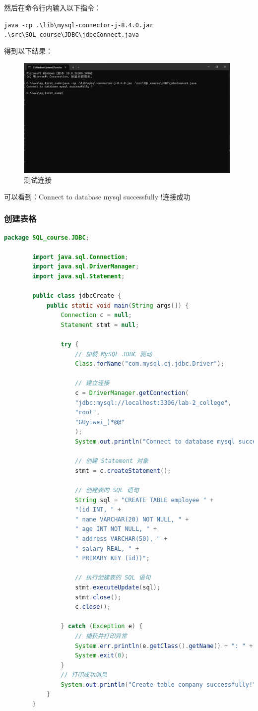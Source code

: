 \documentclass{article}
\begin{document}
	然后在命令行内输入以下指令：
	
	\verb|java -cp .\lib\mysql-connector-j-8.4.0.jar .\src\SQL_course\JDBC\jdbcConnect.java|
	
	得到以下结果：
	
	\begin{figure}[H]
		\centering
		\includegraphics[width=11cm]{./images/6.测试连接.png}
		\caption{测试连接}
	\end{figure}
	
	可以看到：Connect to database mysql successfully !连接成功
	
	\subsubsection{创建表格}
	
	\begin{lstlisting}[language=java, title=jdbcCreate, tabsize=4]
		package SQL_course.JDBC;
		
		import java.sql.Connection;
		import java.sql.DriverManager;
		import java.sql.Statement;
		
		public class jdbcCreate {
			public static void main(String args[]) {
				Connection c = null;
				Statement stmt = null;
				
				try {
					// 加载 MySQL JDBC 驱动
					Class.forName("com.mysql.cj.jdbc.Driver");
					
					// 建立连接
					c = DriverManager.getConnection(
					"jdbc:mysql://localhost:3306/lab-2_college",
					"root",
					"GUyiwei_)*@@"
					);
					System.out.println("Connect to database mysql successfully!");
					
					// 创建 Statement 对象
					stmt = c.createStatement();
					
					// 创建表的 SQL 语句
					String sql = "CREATE TABLE employee " +
					"(id INT, " +
					" name VARCHAR(20) NOT NULL, " +
					" age INT NOT NULL, " +
					" address VARCHAR(50), " +
					" salary REAL, " +
					" PRIMARY KEY (id))";
					
					// 执行创建表的 SQL 语句
					stmt.executeUpdate(sql);
					stmt.close();
					c.close();
					
				} catch (Exception e) {
					// 捕获并打印异常
					System.err.println(e.getClass().getName() + ": " + e.getMessage());
					System.exit(0);
				}
				// 打印成功消息
				System.out.println("Create table company successfully!");
			}
		}
	\end{lstlisting}
	
\end{document}
